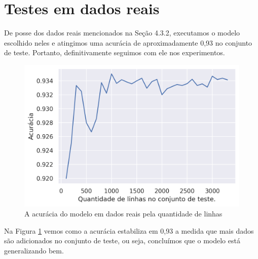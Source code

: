 \section{Testes em dados reais}

De posse dos dados reais mencionados na Seção 4.3.2, executamos o modelo escolhido neles e atingimos 
uma acurácia de aproximadamente 0,93 no conjunto de teste. Portanto, definitivamente
seguimos com ele nos experimentos.


\begin{figure}
    \centering
    \includegraphics[width=.9\textwidth]{figuras/acuracia_em_dados_reais.png}
    \caption{A acurácia do modelo em dados reais pela quantidade de linhas \label{fig:classificacao_por_quantidade_de_linhas}}
\end{figure}

Na Figura \ref{fig:classificacao_por_quantidade_de_linhas} vemos como a acurácia 
estabiliza em 0,93 a medida que mais dados são adicionados no conjunto de teste, 
ou seja, concluímos que o modelo está generalizando bem.